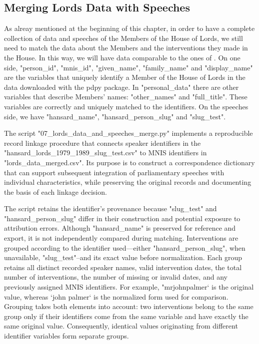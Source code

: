 \subsection{Merging Lords Data with Speeches}
As alreay mentioned at the beginning of this chapter, in order to have a complete collection of data and speeches of the Members of the House of Lords, we still need to match the data about the Members and the interventions they made in the House. In this way, we will have data comparable to the ones of \textcite{blumenauHouseCommonsParliamentary2021}. On one side,
"person\_id", "mnis\_id", "given\_name", "family\_name" and  "display\_name" are the variables that uniquely identify a Member of the House of Lords in the data downloaded with the pdpy package. In "personal\_data" there are other variables that describe Members' names: "other\_names" and "full\_title". These variables are correctly and uniquely matched to the identifiers.
On the speeches side, we have "hansard\_name", "hansard\_person\_slug" and "slug\_test".

The script "07\_lords\_data\_and\_speeches\_merge.py" implements a reproducible record linkage procedure that connects speaker identifiers in the "hansard\_lords\_1979\_1989\_slug\_test.csv"%
to MNIS identifiers in "lords\_data\_merged.csv". Its purpose is to construct a correspondence dictionary that can support subsequent integration of parliamentary speeches with individual characteristics, while preserving the original records and documenting the basis of each linkage decision.

The script retains the identifier’s provenance because "slug\_test" and "hansard\_person\_slug" differ in their construction and potential exposure to attribution errors. Although "hansard\_name" is preserved for reference and export, it is not independently compared during matching. Interventions are grouped according to the identifier used—either "hansard\_person\_slug", when unavailable, "slug\_test"--and its exact value before normalization. Each group retains all distinct recorded speaker names, valid intervention dates, the total number of interventions, the number of missing or invalid dates, and any previously assigned MNIS identifiers. For example, "mr\-john\-palmer` is the original value, whereas `john palmer` is the normalized form used for comparison. Grouping takes both elements into account: two interventions belong to the same group only if their identifiers come from the same variable and have exactly the same original value. Consequently, identical values originating from different identifier variables form separate groups.

